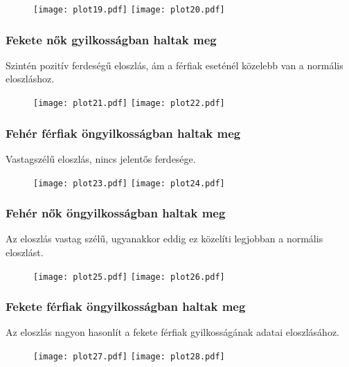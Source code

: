 \documentclass{article}
\begin{document}
\begin{figure}[!htb]
\texttt{[image: plot19.pdf]}
\texttt{[image: plot20.pdf]}
\end{figure}

\subsubsection{Fekete nők gyilkosságban haltak meg}

Szintén pozitív ferdeségű eloszlás, ám a férfiak eseténél közelebb van a normális eloszláshoz.

\begin{figure}[!htb]
\texttt{[image: plot21.pdf]}
\texttt{[image: plot22.pdf]}
\end{figure}

\subsubsection{Fehér férfiak öngyilkosságban haltak meg}

Vastagszélű eloszlás, nincs jelentős ferdesége.

\begin{figure}[!htb]
\texttt{[image: plot23.pdf]}
\texttt{[image: plot24.pdf]}
\end{figure}

\subsubsection{Fehér nők öngyilkosságban haltak meg}

Az eloszlás vastag szélű, ugyanakkor eddig ez közelíti legjobban a normális eloszlást.

\begin{figure}[!htb]
\texttt{[image: plot25.pdf]}
\texttt{[image: plot26.pdf]}
\end{figure}

\subsubsection{Fekete férfiak öngyilkosságban haltak meg}

Az eloszlás nagyon hasonlít a fekete férfiak gyilkosságának adatai eloszlásához.

\begin{figure}[!htb]
\texttt{[image: plot27.pdf]}
\texttt{[image: plot28.pdf]}
\end{figure}
\end{document}
